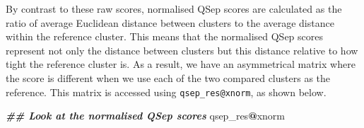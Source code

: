 \documentclass[9pt,a4paper,]{extarticle}
\newenvironment{Shaded}{\begin{snugshade}}{\end{snugshade}}
\newcommand{\DocumentationTok}[1]{\textcolor[rgb]{0.56,0.35,0.01}{\textbf{\textit{#1}}}}
\newcommand{\NormalTok}[1]{#1}
\newcommand{\SpecialCharTok}[1]{\textcolor[rgb]{0.81,0.36,0.00}{\textbf{#1}}}
\begin{document}
By contrast to these raw scores, normalised QSep scores are calculated as the
ratio of average Euclidean distance between clusters to the average distance within
the reference cluster. This means that the normalised QSep scores represent not
only the distance between clusters but this distance relative to how tight the
reference cluster is. As a result, we have an asymmetrical matrix where the
score is different when we use each of the two compared clusters as the reference.
This matrix is accessed using \texttt{qsep\_res@xnorm}, as shown below.

\begin{Shaded}
\begin{Highlighting}[]
\DocumentationTok{\#\# Look at the normalised QSep scores }
\NormalTok{qsep\_res}\SpecialCharTok{@}\NormalTok{xnorm}
\end{Highlighting}
\end{Shaded}
\end{document}
